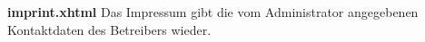 \begin{samepage}
    \textbf{imprint.xhtml} Das Impressum gibt die vom Administrator angegebenen Kontaktdaten des Betreibers wieder.\nopagebreak

\end{samepage}

